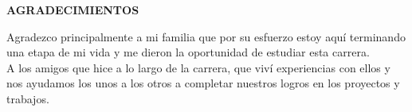 \newpage
\thispagestyle{empty}

\begin{center}
{\bf \Large AGRADECIMIENTOS}
\end{center}

\vspace*{1cm}

Agradezco principalmente a mi familia que por su esfuerzo estoy aquí terminando una etapa de mi vida y me dieron la oportunidad de estudiar esta carrera.\\

A los amigos que hice a lo largo de la carrera, que viví experiencias con ellos y nos ayudamos los unos a los otros a completar nuestros logros en los proyectos y trabajos.\\


\pagebreak